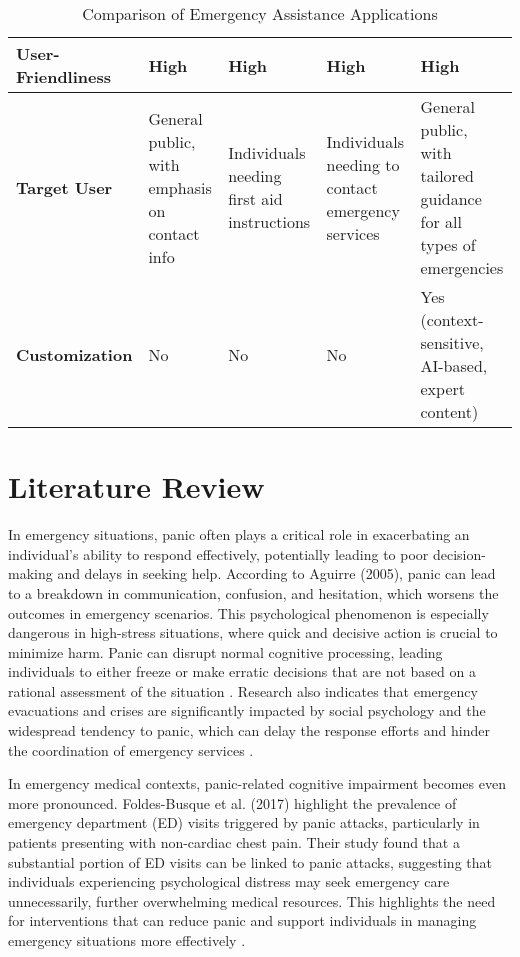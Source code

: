 \begin{table}[htp]
\begin{tabular}{|p{2.2cm}|p{2.2cm}|p{2.2cm}|p{2.2cm}|p{2.2cm}|}
\textbf{User-Friendliness}                  & High                                              & High                                          & High                                           & High                                             \\ \hline
\textbf{Target User}                        & General public, with emphasis on contact info     & Individuals needing first aid instructions   & Individuals needing to contact emergency services & General public, with tailored guidance for all types of emergencies \\ \hline
\textbf{Customization}      & No                                                & No                                            & No                                             & Yes (context-sensitive, AI-based, expert content) \\ \hline
\end{tabular}
\caption{Comparison of Emergency Assistance Applications}
\label{tab:competitor-analysis}
\end{table}
    
\section{Literature Review}
\label{section:literature-review}


In emergency situations, panic often plays a critical role in exacerbating an individual's ability to respond effectively, potentially leading to poor decision-making and delays in seeking help. According to Aguirre (2005), panic can lead to a breakdown in communication, confusion, and hesitation, which worsens the outcomes in emergency scenarios. This psychological phenomenon is especially dangerous in high-stress situations, where quick and decisive action is crucial to minimize harm. Panic can disrupt normal cognitive processing, leading individuals to either freeze or make erratic decisions that are not based on a rational assessment of the situation \cite{aguirre2005emergency}. Research also indicates that emergency evacuations and crises are significantly impacted by social psychology and the widespread tendency to panic, which can delay the response efforts and hinder the coordination of emergency services \cite{aguirre2005emergency}.

In emergency medical contexts, panic-related cognitive impairment becomes even more pronounced. Foldes-Busque et al. (2017) highlight the prevalence of emergency department (ED) visits triggered by panic attacks, particularly in patients presenting with non-cardiac chest pain. Their study found that a substantial portion of ED visits can be linked to panic attacks, suggesting that individuals experiencing psychological distress may seek emergency care unnecessarily, further overwhelming medical resources. This highlights the need for interventions that can reduce panic and support individuals in managing emergency situations more effectively \cite{foldesbusque2017closer}.

